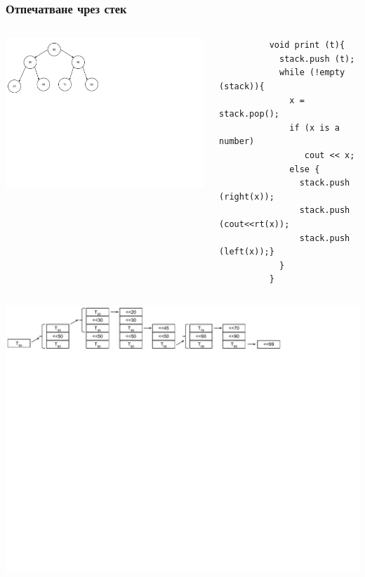\documentclass{beamer}
\begin{document}
\begin{frame}[fragile]
\frametitle{Отпечатване чрез стек}


\begin{columns}[t]
  \begin{column}{0.4\textwidth}

\includegraphics[width=11cm]{images/tree_bot_clean}
  \end{column}
  \begin{column}{0.6\textwidth}

      \begin{flushleft}
        \begin{lstlisting}
          void print (t){
            stack.push (t);
            while (!empty (stack)){
              x = stack.pop();
              if (x is a number)
                 cout << x;
              else {
                stack.push (right(x));
                stack.push (cout<<rt(x));
                stack.push (left(x));}
            }
          }
        \end{lstlisting}
      \end{flushleft}

  \end{column}
\end{columns}

\vspace{-120px}
\includegraphics[width=15cm]{images/tree_print_with_stack}


\end{frame}
\end{document}
